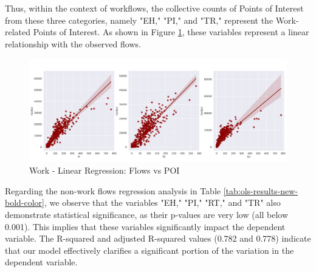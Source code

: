         Thus, within the context of workflows, the collective counts of Points of Interest from these three categories, namely "EH," "PI," and "TR," represent the Work-related Points of Interest. As shown in Figure \ref{fig: Regression_work}, these variables represent a linear relationship with the observed flows.

        \begin{figure}[H]
            \centering
            \includegraphics[width=14cm]{Images/regression_work.png}
            \caption{Work - Linear Regression: Flows vs POI}
            \label{fig: Regression_work}
        \end{figure}

        Regarding the non-work flows regression analysis in Table \ref{tab:ols-results-new-bold-color}, we observe that the variables "EH," "PI," "RT," and "TR" also demonstrate statistical significance, as their p-values are very low (all below 0.001). This implies that these variables significantly impact the dependent variable. The R-squared and adjusted R-squared values (0.782 and 0.778) indicate that our model effectively clarifies a significant portion of the variation in the dependent variable.  

